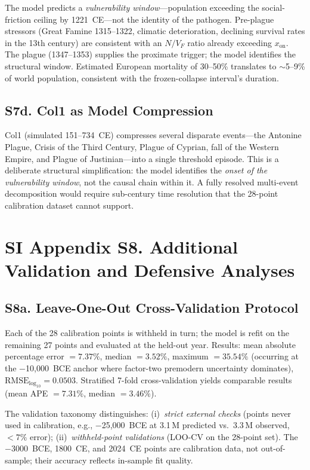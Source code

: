 \documentclass[11pt]{article}
\begin{document}
The model predicts a \emph{vulnerability window}---population exceeding the social-friction
ceiling by 1221~CE---not the identity of the pathogen.
Pre-plague stressors (Great Famine 1315--1322, climatic deterioration, declining survival rates
in the 13th century) are consistent with an $N/V_F$ ratio already exceeding $x_{\mathrm{on}}$.
The plague (1347--1353) supplies the proximate trigger; the model identifies the structural window.
Estimated European mortality of 30--50\% translates to $\sim$5--9\% of world population,
consistent with the frozen-collapse interval's duration.

\subsection*{S7d. Col1 as Model Compression}

Col1 (simulated 151--734~CE) compresses several disparate events---the Antonine Plague,
Crisis of the Third Century, Plague of Cyprian, fall of the Western Empire, and Plague of
Justinian---into a single threshold episode.
This is a deliberate structural simplification: the model identifies the \emph{onset of the
vulnerability window}, not the causal chain within it.
A fully resolved multi-event decomposition would require sub-century time resolution that the
28-point calibration dataset cannot support.

\section*{SI Appendix S8. Additional Validation and Defensive Analyses}
\label{sec:S8_validation}

\subsection*{S8a. Leave-One-Out Cross-Validation Protocol}

Each of the 28 calibration points is withheld in turn; the model is refit on the remaining 27
points and evaluated at the held-out year.
Results: mean absolute percentage error $=7.37\%$, median $=3.52\%$, maximum $=35.54\%$
(occurring at the $-$10,000~BCE anchor where factor-two premodern uncertainty dominates),
$\mathrm{RMSE}_{\log_{10}}=0.0503$.
Stratified 7-fold cross-validation yields comparable results (mean APE $=7.31\%$, median $=3.46\%$).

The validation taxonomy distinguishes:
(i)~\emph{strict external checks} (points never used in calibration, e.g., $-$25,000~BCE
at 3.1\,M predicted vs.\ 3.3\,M observed, $<7\%$ error);
(ii)~\emph{withheld-point validations} (LOO-CV on the 28-point set).
The $-$3000~BCE, 1800~CE, and 2024~CE points are calibration data, not out-of-sample;
their accuracy reflects in-sample fit quality.
\end{document}

